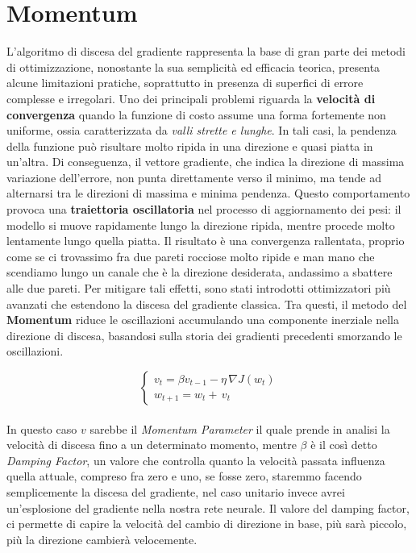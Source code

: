\section{Momentum}
L'algoritmo di discesa del gradiente rappresenta la base di gran parte dei metodi di ottimizzazione, nonostante la sua semplicità ed efficacia teorica, presenta alcune limitazioni pratiche, soprattutto in presenza di superfici di errore complesse e irregolari. Uno dei principali problemi riguarda la \textbf{velocità di convergenza} quando la funzione di costo assume una forma fortemente non uniforme, ossia caratterizzata da \textit{valli strette e lunghe}. In tali casi, la pendenza della funzione può risultare molto ripida in una direzione e quasi piatta in un'altra. Di conseguenza, il vettore gradiente, che indica la direzione di massima variazione dell'errore, non punta direttamente verso il minimo, ma tende ad alternarsi tra le direzioni di massima e minima pendenza. Questo comportamento provoca una \textbf{traiettoria oscillatoria} nel processo di aggiornamento dei pesi: il modello si muove rapidamente lungo la direzione ripida, mentre procede molto lentamente lungo quella piatta. Il risultato è una convergenza rallentata, proprio come se ci trovassimo fra due pareti rocciose molto ripide e man mano che scendiamo lungo un canale che è la direzione desiderata, andassimo a sbattere alle due pareti. Per mitigare tali effetti, sono stati introdotti ottimizzatori più avanzati che estendono la discesa del gradiente classica. Tra questi, il metodo del \textbf{Momentum} riduce le oscillazioni accumulando una componente inerziale nella direzione di discesa, basandosi sulla storia dei gradienti precedenti smorzando le oscillazioni.


\begin{equation}
    \left\{\begin{array}{c}
    v_{t} = \beta v_{t-1} - \eta\,\nabla J(w_t)
    \\
    w_{t+1} = w_t + \,v_{t}
    \end{array}\right.
\end{equation}
\\
In questo caso $v$ sarebbe il \textit{Momentum Parameter} il quale prende in analisi la velocità di discesa fino a un determinato momento, mentre $\beta$ è il così detto \textit{Damping Factor}, un valore che controlla quanto la velocità passata influenza quella attuale, compreso fra zero e uno, se fosse zero, staremmo facendo semplicemente la discesa del gradiente, nel caso unitario invece avrei un'esplosione del gradiente nella nostra rete neurale. Il valore del damping factor, ci permette di capire la velocità del cambio di direzione in base, più sarà piccolo, più la direzione cambierà velocemente.

